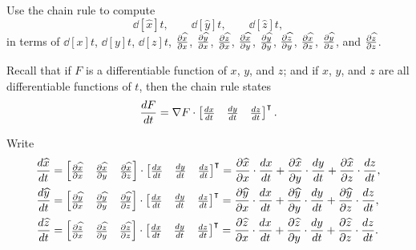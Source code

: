 \documentclass[newpage,hints,handout]{ximera}
\begin{document}
\begin{problem}
  Use the chain rule to compute
  \[
  \dd[\hat x]{t}, \qquad \dd[\hat y]{t}, \qquad \dd[\hat z]{t},
  \]
  in terms of $\dd[x]{t}$, $\dd[y]{t}$, $\dd[z]{t}$, $\pp[\hat x]{x}$, $\pp[\hat y]{x}$, $\pp[\hat z]{x}$,
  $\pp[\hat x]{y}$, $\pp[\hat y]{y}$, $\pp[\hat z]{y}$, $\pp[\hat x]{z}$, $\pp[\hat y]{z}$, and $\pp[\hat z]{z}$. 
  \begin{hint}
    Recall that if $F$ is a differentiable function of $x$, $y$, and
    $z$; and if $x$, $y$, and $z$ are all differentiable functions of
    $t$, then the chain rule states
    \[
    \dd[F]{t} = \nabla F \cdot
    \begin{bmatrix}
      \dd[x]{t} & \dd[y]{t} & \dd[z]{t}
    \end{bmatrix}^\transpose.
    \]
  \end{hint}
  \begin{freeResponse}
    Write
    \begin{align*}
      \dd[\hat x]{t} &= \begin{bmatrix} \pp[\hat x]{x} & \pp[\hat x]{y} & \pp[\hat x]{z} \end{bmatrix} \cdot \begin{bmatrix} \dd[x]{t} & \dd[y]{t} & \dd[z]{t} \end{bmatrix}^\transpose
      = \pp[\hat x]{x}\cdot\dd[x]{t} + \pp[\hat x]{y}\cdot\dd[y]{t} + \pp[\hat x]{z}\cdot\dd[z]{t}, \\
      \dd[\hat y]{t} &= \begin{bmatrix} \pp[\hat y]{x} & \pp[\hat y]{y} & \pp[\hat y]{z} \end{bmatrix} \cdot \begin{bmatrix} \dd[x]{t} & \dd[y]{t} & \dd[z]{t} \end{bmatrix}^\transpose
      = \pp[\hat y]{x}\cdot\dd[x]{t} + \pp[\hat y]{y}\cdot\dd[y]{t} + \pp[\hat y]{z}\cdot\dd[z]{t}, \\
      \dd[\hat z]{t} &= \begin{bmatrix} \pp[\hat z]{x} & \pp[\hat z]{y} & \pp[\hat z]{z} \end{bmatrix} \cdot \begin{bmatrix} \dd[x]{t} & \dd[y]{t} & \dd[z]{t} \end{bmatrix}^\transpose
      = \pp[\hat z]{x}\cdot\dd[x]{t} + \pp[\hat z]{y}\cdot\dd[y]{t} + \pp[\hat z]{z}\cdot\dd[z]{t}.
    \end{align*}
  \end{freeResponse}
\end{problem}
\end{document}
